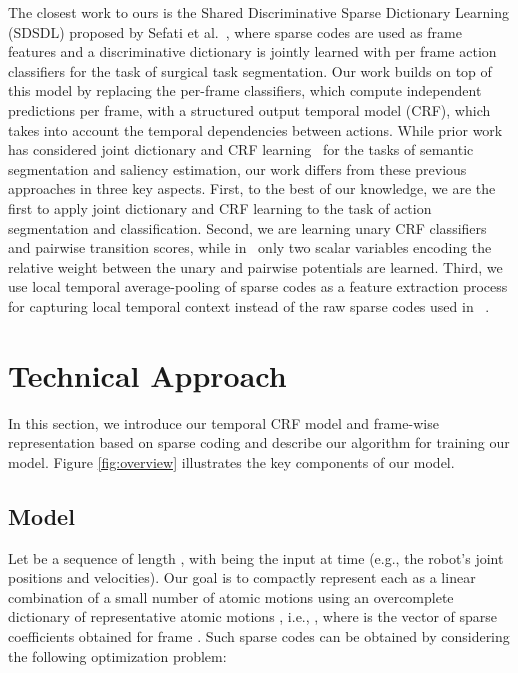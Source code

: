 \documentclass[10pt,twocolumn,letterpaper]{article}
\begin{document}
The closest work to ours is the Shared Discriminative Sparse Dictionary Learning (SDSDL) proposed by Sefati et al.~\cite{Sefati:M2CAI15}, where sparse codes are used as frame features and a discriminative dictionary is jointly learned with per frame action classifiers for the task of surgical task segmentation. Our work builds on top of this model by replacing the per-frame classifiers, which compute independent predictions per frame, with a structured output temporal model (CRF), which takes into account the temporal dependencies between actions. While prior work has considered joint dictionary and CRF learning~\cite{Tao:ECCV14,Yang:CVPR12,Yang:PAMI17} for the tasks of semantic segmentation and saliency estimation, our work differs from these previous approaches in three key aspects. First, to the best of our knowledge, we are the first to apply joint dictionary and CRF learning to the task of action segmentation and classification.
Second, we are learning unary CRF classifiers and pairwise transition scores, while in~\cite{Tao:ECCV14} only two scalar variables encoding the relative weight between the unary and pairwise potentials are learned. Third, we use local temporal average-pooling of sparse codes as a feature extraction process for capturing local temporal context instead of the raw sparse codes used in ~\cite{Yang:CVPR12,Yang:PAMI17}. 

\section{Technical Approach}

In this section, we introduce our temporal CRF model and frame-wise representation based on sparse coding and describe our algorithm for training our model. Figure \ref{fig:overview} illustrates the key components of our model.


\subsection{Model}
Let  be a sequence of length , with  being the input at time  (e.g., the robot's joint positions and velocities). Our goal is to compactly represent each  as a linear combination of a small number of atomic motions using an overcomplete dictionary of representative atomic motions , i.e., , where  is the vector of sparse coefficients obtained for frame . Such sparse codes can be obtained by considering the following optimization problem:
\end{document}
